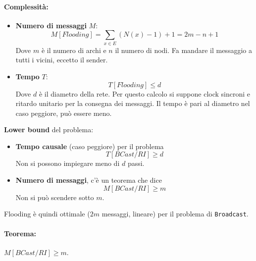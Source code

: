 \newpage

\paragraph{Complessità:}
\begin{itemize}
	\item \textbf{Numero di messaggi} $M$:
	$$ M[Flooding] = \sum_{x \in E} (N(x) - 1) + 1 = 2m - n + 1$$
	Dove $m$ è il numero di archi e $n$ il numero di nodi. Fa mandare il messaggio a tutti i vicini, eccetto il sender.\\
	
	\item \textbf{Tempo} $T$: 
	$$ T[Flooding] \leq d $$
	Dove $d$ è il diametro della rete. Per questo calcolo si suppone clock sincroni e ritardo unitario per la consegna dei messaggi. Il tempo è pari al diametro nel caso peggiore, può essere meno.\\
\end{itemize}

\textbf{Lower bound} del problema: 
\begin{itemize}
	\item \textbf{Tempo causale} (caso peggiore) per il problema
	$$ T[BCast/RI] \geq d$$
	Non si possono impiegare meno di $d$ passi.\\
	
	\item \textbf{Numero di messaggi}, c'è un teorema che dice
	$$ M[BCast/RI] \geq m$$
	Non si può scendere sotto $m$.\\
\end{itemize}

Flooding è quindi ottimale ($2m$ messaggi, lineare) per il problema di \texttt{Broadcast}.\\

\newpage

\paragraph{Teorema:} $M[BCast/RI] \geq m$.\\

